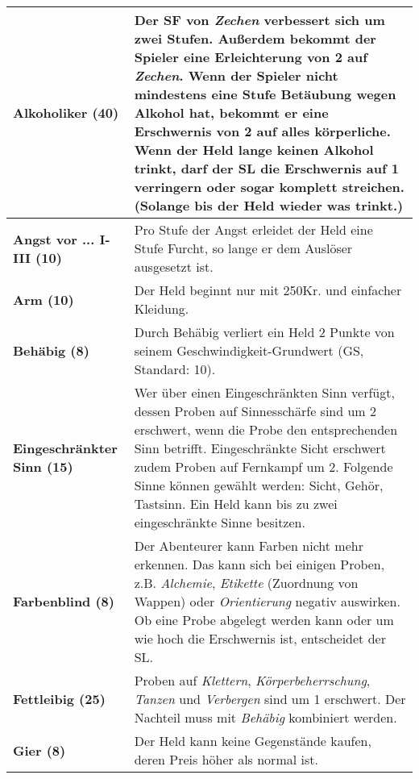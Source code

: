 \begin{longtable}{|p{5cm}|p{11cm}|}
\hline

\textbf{Alkoholiker (40)} & Der SF von \textit{Zechen} verbessert sich um zwei Stufen. Außerdem bekommt der Spieler eine Erleichterung von 2 auf \textit{Zechen}. Wenn der Spieler nicht mindestens eine Stufe Betäubung wegen Alkohol hat, bekommt er eine Erschwernis von 2 auf alles körperliche. Wenn der Held lange keinen Alkohol trinkt, darf der SL die Erschwernis auf 1 verringern oder sogar komplett streichen. (Solange bis der Held wieder was trinkt.) \\ \hline

\textbf{Angst vor ... I-III (10)} & Pro Stufe der Angst erleidet der Held eine Stufe Furcht, so lange er dem Auslöser ausgesetzt ist. \\ \hline

\textbf{Arm (10)} & Der Held beginnt nur mit 250Kr. und einfacher Kleidung. \\ \hline

\textbf{Behäbig (8)} & Durch Behäbig verliert ein Held 2 Punkte von seinem Geschwindigkeit-Grundwert (GS, Standard: 10). \\ \hline

\textbf{Eingeschränkter Sinn (15)} & Wer über einen Eingeschränkten Sinn verfügt, dessen Proben auf Sinnesschärfe sind um 2 erschwert, wenn die Probe den entsprechenden Sinn betrifft. Eingeschränkte Sicht erschwert zudem Proben auf Fernkampf um 2. Folgende Sinne können gewählt werden: Sicht, Gehör, Tastsinn. Ein Held kann bis zu zwei eingeschränkte Sinne besitzen. \\ \hline

\textbf{Farbenblind (8)} & Der Abenteurer kann Farben nicht mehr erkennen. Das kann sich bei einigen Proben, z.B. \textit{Alchemie}, \textit{Etikette} (Zuordnung von Wappen) oder \textit{Orientierung} negativ auswirken. Ob eine Probe abgelegt werden kann oder um wie hoch die Erschwernis ist, entscheidet der SL. \\ \hline

\textbf{Fettleibig (25)} & Proben auf \textit{Klettern}, \textit{Körperbeherrschung}, \textit{Tanzen} und \textit{Verbergen} sind um 1 erschwert. Der Nachteil muss mit \textit{Behäbig} kombiniert werden. \\ \hline

\textbf{Gier (8)} & Der Held kann keine Gegenstände kaufen, deren Preis höher als normal ist. \\ \hline


\end{longtable}
